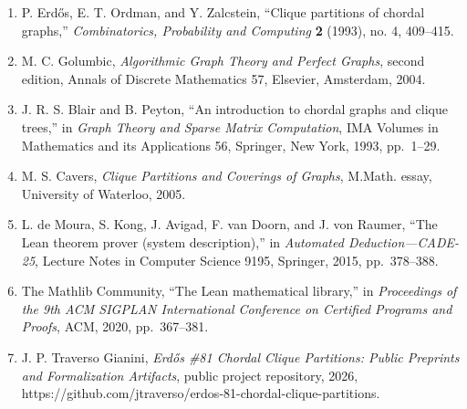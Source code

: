 \documentclass[
  11pt,
]{article}
\begin{document}
\begin{enumerate}
\def\labelenumi{\arabic{enumi}.}
\item
  P. Erdős, E. T. Ordman, and Y. Zalcstein, ``Clique partitions of
  chordal graphs,'' \emph{Combinatorics, Probability and Computing}
  \textbf{2} (1993), no. 4, 409--415.
\item
  M. C. Golumbic, \emph{Algorithmic Graph Theory and Perfect Graphs},
  second edition, Annals of Discrete Mathematics 57, Elsevier,
  Amsterdam, 2004.
\item
  J. R. S. Blair and B. Peyton, ``An introduction to chordal graphs and
  clique trees,'' in \emph{Graph Theory and Sparse Matrix Computation},
  IMA Volumes in Mathematics and its Applications 56, Springer, New
  York, 1993, pp.~1--29.
\item
  M. S. Cavers, \emph{Clique Partitions and Coverings of Graphs},
  M.Math. essay, University of Waterloo, 2005.
\item
  L. de Moura, S. Kong, J. Avigad, F. van Doorn, and J. von Raumer,
  ``The Lean theorem prover (system description),'' in \emph{Automated
  Deduction---CADE-25}, Lecture Notes in Computer Science 9195,
  Springer, 2015, pp.~378--388.
\item
  The Mathlib Community, ``The Lean mathematical library,'' in
  \emph{Proceedings of the 9th ACM SIGPLAN International Conference on
  Certified Programs and Proofs}, ACM, 2020, pp.~367--381.
\item
  J. P. Traverso Gianini, \emph{Erdős \#81 Chordal Clique Partitions:
  Public Preprints and Formalization Artifacts}, public project
  repository, 2026,
  https://github.com/jtraverso/erdos-81-chordal-clique-partitions.
\end{enumerate}
\end{document}
